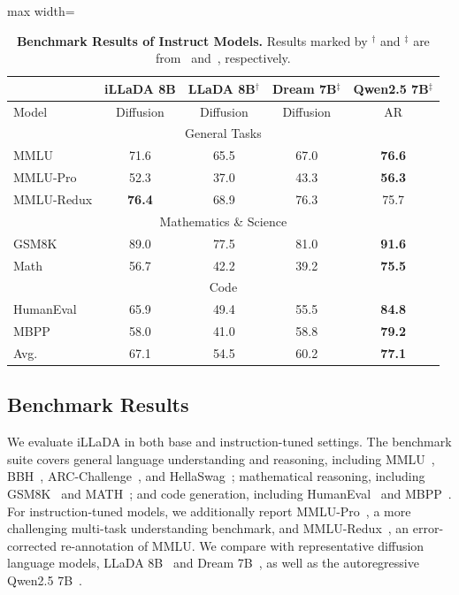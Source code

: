 \documentclass{llmxive}
\begin{document}
\begin{table}[t!]
    \centering
    \begin{adjustbox}{max width=\textwidth}
    \begin{tabular}{l|cccc}
      \toprule
          & iLLaDA 8B & LLaDA 8B$^{\dagger}$ & Dream 7B$^{\ddagger}$ & Qwen2.5 7B$^{\ddagger}$ \\
      \midrule
      Model & Diffusion & Diffusion & Diffusion & AR \\
      \midrule
      \multicolumn{5}{c}{General Tasks}\\
      \midrule
      MMLU & 71.6 & 65.5 & 67.0 & \textbf{76.6} \\
      MMLU-Pro & 52.3 & 37.0 & 43.3 & \textbf{56.3} \\
      MMLU-Redux & \textbf{76.4} & 68.9 & 76.3 & 75.7 \\
      \midrule
      \multicolumn{5}{c}{Mathematics \& Science}\\
      \midrule
      GSM8K & 89.0 & 77.5 & 81.0 & \textbf{91.6} \\
      Math & 56.7 & 42.2 & 39.2 & \textbf{75.5} \\
      \midrule
      \multicolumn{5}{c}{Code} \\
      \midrule
      HumanEval & 65.9 & 49.4 & 55.5 & \textbf{84.8} \\
      MBPP & 58.0 & 41.0 & 58.8 & \textbf{79.2} \\
      \midrule
      Avg. & 67.1 & 54.5 & 60.2 & \textbf{77.1} \\
      \bottomrule
    \end{tabular}
    \end{adjustbox}
    \vspace{-.2cm}
\caption{\textbf{Benchmark Results of Instruct Models.} Results marked by $^{\dagger}$ and $^{\ddagger}$ are from~\citet{nie2026large} and~\citet{ye2025dream}, respectively.}
\label{tab:sft}
\end{table}

\subsection{Benchmark Results}
\label{sec:results}


We evaluate iLLaDA in both base and instruction-tuned settings. The benchmark suite covers general language understanding and reasoning, including MMLU~\citep{hendrycks2020measuring}, BBH~\citep{suzgun2022challenging}, ARC-Challenge~\citep{clark2018think}, and HellaSwag~\citep{zellers2019hellaswag}; mathematical reasoning, including GSM8K~\citep{cobbe2021training} and MATH~\citep{hendrycks2021measuring}; and code generation, including HumanEval~\citep{chen2021evaluating} and MBPP~\citep{austin2021program}. For instruction-tuned models, we additionally report MMLU-Pro~\citep{wang2024mmlupro}, a more challenging multi-task understanding benchmark, and MMLU-Redux~\citep{gema2024done}, an error-corrected re-annotation of MMLU. We compare with representative diffusion language models, LLaDA 8B~\citep{nie2026large} and Dream 7B~\citep{ye2025dream}, as well as the autoregressive Qwen2.5 7B~\citep{qwen2.5}.
\end{document}

